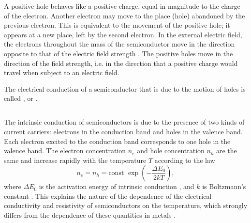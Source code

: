 A positive hole behaves like a positive charge, equal in magnitude to the charge of the electron. Another electron may move to the place (hole) abandoned by the previous electron. This is equivalent to the movement of the positive hole; it appears at a new place, left by the second electron. In the external electric field, the electrons throughout the mass of the semiconductor move in the direction opposite to that of the electric field strength . The positive holes move in the direction of the field strength, i.e. in the direction that a positive charge would travel when subject to an electric field. 

The electrical conduction of a semiconductor that is due to the motion of holes is called , or .

\subsection{}\label{41.10.4} The intrinsic conduction of semiconductors is due to the presence of two kinds of current carriers: electrons in the conduction band and holes in the valence band. Each electron excited to the conduction band corresponds to one hole in the valence band. The electron concentration $n_{e}$ and hole concentration $n_{h}$ are the same and increase rapidly with the temperature $T$ according to the law
\begin{equation*}%
n_{e} = n_{h} = \text{const } \exp \left(-\frac{\Delta E_{0}}{2kT} \right),
\end{equation*}
where $\Delta E_{0}$ is the activation energy of intrinsic conduction  , and $k$ is Boltzmann's constant . This explains the nature of the dependence of the electrical conductivity and resistivity of semiconductors  on the temperature, which strongly differs from the dependence of these quantities in metals .

